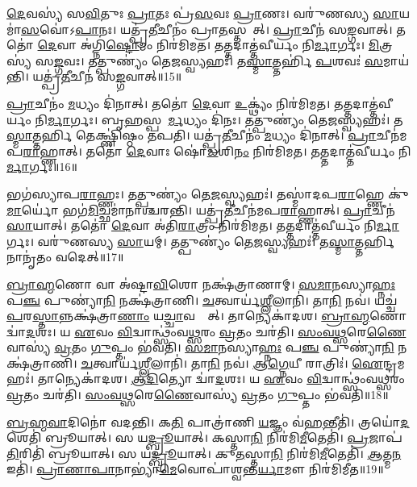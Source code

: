 \ul{𑌦𑍇}𑌵𑌸𑍍𑌯॑ 𑌸\ul{𑌵𑌿}𑌤𑍁𑌃 \ul{𑌪𑍍𑌰𑌾}𑌤𑌃 𑌪𑍍𑌰॑\ul{𑌸}𑌵𑌃 \ul{𑌪𑍍𑌰𑌾}𑌣𑌃।
𑌵𑌰𑍁॑𑌣𑌸𑍍𑌯 \ul{𑌸𑌾}𑌯𑌮𑌾॑\ul{𑌸}𑌵𑍋॑\-𑌽\ul{𑌪𑌾}𑌨𑌃।
𑌯𑌤𑍍𑌪𑍍𑌰॑\ul{𑌤𑍀}𑌚𑍀𑌨𑌂॑ 𑌪𑍍𑌰𑌾\ul{𑌤}𑌸𑍍𑌤𑌨𑌾᳚𑌤𑍍।
\ul{𑌪𑍍𑌰𑌾}𑌚𑍀𑌨॑ 𑌸\ul{𑌙𑍍𑌗}𑌵𑌾𑌤𑍍।
𑌤𑌤𑍋॑ \ul{𑌦𑍇}𑌵𑌾 𑌅॑𑌗𑍍𑌨𑌿\ul{𑌷𑍍𑌟𑍋}𑌮𑌂 𑌨𑌿𑌰॑𑌮𑌿𑌮𑌤।
𑌤𑌤𑍍𑌤𑌦𑌾𑌤𑍍𑌤॑𑌵𑍀𑌰𑍍𑌯𑌂 𑌨𑌿\ul{𑌰𑍍𑌮𑌾}𑌰𑍍𑌗𑌃।
\ul{𑌮𑌿}𑌤𑍍𑌰𑌸𑍍𑌯॑ 𑌸\ul{𑌙𑍍𑌗}𑌵𑌃।
𑌤𑌤𑍍𑌪𑍁𑌣𑍍𑌯𑌂॑ 𑌤𑍇\ul{𑌜}𑌸𑍍𑌵𑍍𑌯𑌹𑌃॑।
𑌤\ul{𑌸𑍍𑌮𑌾}𑌤𑍍𑌤𑌰𑍍\mbox{}𑌹𑌿॑ \ul{𑌪}𑌶𑌵𑌃॑ \ul{𑌸}𑌮𑌾𑌯॑𑌨𑍍𑌤𑌿।
𑌯𑌤𑍍𑌪𑍍𑌰॑\ul{𑌤𑍀}𑌚𑍀𑌨॑ 𑌸\ul{𑌙𑍍𑌗}𑌵𑌾𑌤𑍍॥15॥

\ul{𑌪𑍍𑌰𑌾}𑌚𑍀𑌨𑌂॑ \ul{𑌮}𑌧𑍍𑌯𑌂 𑌦𑌿॑𑌨𑌾𑌤𑍍।
𑌤𑌤𑍋॑ \ul{𑌦𑍇}𑌵𑌾 \ul{𑌉}𑌕𑍍𑌥𑍍𑌯𑌂॑ 𑌨𑌿𑌰॑𑌮𑌿𑌮𑌤।
𑌤𑌤𑍍𑌤𑌦𑌾𑌤𑍍𑌤॑𑌵𑍀𑌰𑍍𑌯𑌂 𑌨𑌿\ul{𑌰𑍍𑌮𑌾}𑌰𑍍𑌗𑌃।
𑌬𑍃\ul{𑌹}𑌸𑍍𑌪𑌤𑍇᳚\ul{𑌰𑍍𑌮}𑌧𑍍𑌯𑌂 𑌦𑌿॑𑌨𑌃।
𑌤𑌤𑍍𑌪𑍁𑌣𑍍𑌯𑌂॑ 𑌤𑍇\ul{𑌜}𑌸𑍍𑌵𑍍𑌯𑌹𑌃॑।
𑌤\ul{𑌸𑍍𑌮𑌾}𑌤𑍍𑌤𑌰𑍍\mbox{}\ul{𑌹𑌿} 𑌤𑍇𑌕𑍍𑌷𑍍𑌣𑌿॑𑌷𑍍𑌠𑌂 𑌤𑌪𑌤𑌿।
𑌯𑌤𑍍𑌪𑍍𑌰॑\ul{𑌤𑍀}𑌚𑍀𑌨𑌂॑ \ul{𑌮}𑌧𑍍𑌯𑌂 𑌦𑌿॑𑌨𑌾𑌤𑍍।
\ul{𑌪𑍍𑌰𑌾}𑌚𑍀𑌨॑𑌮𑌪\ul{𑌰𑌾}𑌹𑍍𑌣𑌾𑌤𑍍।
𑌤𑌤𑍋॑ \ul{𑌦𑍇}𑌵𑌾𑌃 𑌷𑍋॑\ul{𑌡}𑌶𑌿\ul{𑌨𑌂} 𑌨𑌿𑌰॑𑌮𑌿𑌮𑌤।
𑌤𑌤𑍍𑌤𑌦𑌾𑌤𑍍𑌤॑𑌵𑍀𑌰𑍍𑌯𑌂 𑌨𑌿\ul{𑌰𑍍𑌮𑌾}𑌰𑍍𑌗𑌃॥16॥

𑌭𑌗॑𑌸𑍍𑌯𑌾𑌪\ul{𑌰𑌾}𑌹𑍍𑌣𑌃।
𑌤𑌤𑍍𑌪𑍁𑌣𑍍𑌯𑌂॑ 𑌤𑍇\ul{𑌜}𑌸𑍍𑌵𑍍𑌯𑌹𑌃॑।
𑌤𑌸𑍍𑌮𑌾॑𑌦𑌪\ul{𑌰𑌾}𑌹𑍍𑌣𑍇 𑌕𑍁॑\ul{𑌮𑌾}𑌰𑍍𑌯𑍋॑ 𑌭𑌗॑\ul{𑌮𑌿}𑌚𑍍𑌛𑌮𑌾॑𑌨𑌾𑌶𑍍𑌚𑌰𑌨𑍍𑌤𑌿।
𑌯𑌤𑍍𑌪𑍍𑌰॑\ul{𑌤𑍀}𑌚𑍀𑌨॑𑌮𑌪\ul{𑌰𑌾}𑌹𑍍𑌣𑌾𑌤𑍍।
\ul{𑌪𑍍𑌰𑌾}𑌚𑍀𑌨॑ \ul{𑌸𑌾}𑌯𑌾𑌤𑍍।
𑌤𑌤𑍋॑ \ul{𑌦𑍇}𑌵𑌾 𑌅॑𑌤𑌿\ul{𑌰𑌾}𑌤𑍍𑌰𑌂 𑌨𑌿𑌰॑𑌮𑌿𑌮𑌤।
𑌤𑌤𑍍𑌤𑌦𑌾𑌤𑍍𑌤॑𑌵𑍀𑌰𑍍𑌯𑌂 𑌨𑌿\ul{𑌰𑍍𑌮𑌾}𑌰𑍍𑌗𑌃।
𑌵𑌰𑍁॑𑌣𑌸𑍍𑌯 \ul{𑌸𑌾}𑌯𑌮𑍍।
𑌤𑌤𑍍𑌪𑍁𑌣𑍍𑌯𑌂॑ 𑌤𑍇\ul{𑌜}𑌸𑍍𑌵𑍍𑌯𑌹𑌃॑।
𑌤\ul{𑌸𑍍𑌮𑌾}𑌤𑍍𑌤𑌰𑍍\mbox{}\ul{𑌹𑌿} 𑌨𑌾𑌨𑍃॑𑌤𑌂 𑌵𑌦𑍇𑌤𑍍॥17॥

\ul{𑌬𑍍𑌰𑌾}\ul{𑌹𑍍𑌮}𑌣𑍋 𑌵𑌾 𑌅॑𑌷𑍍𑌟𑌾\ul{𑌵𑌿}\ul{}𑌶𑍋 𑌨𑌕𑍍𑌷॑𑌤𑍍𑌰𑌾𑌣𑌾𑌮𑍍।
\ul{𑌸}\ul{𑌮𑌾}𑌨𑌸𑍍𑌯𑌾\ul{𑌹𑍍𑌨𑌃} 𑌪\ul{𑌞𑍍𑌚} 𑌪𑍁𑌣𑍍𑌯𑌾॑\ul{𑌨𑌿} 𑌨𑌕𑍍𑌷॑𑌤𑍍𑌰𑌾𑌣𑌿।
\ul{𑌚}𑌤𑍍𑌵𑌾𑌰𑍍𑌯॑\ul{𑌶𑍍𑌲𑍀}𑌲𑌾𑌨𑌿॑।
𑌤𑌾\ul{𑌨𑌿} 𑌨𑌵॑।
𑌯𑌚𑍍𑌚॑ \ul{𑌪}𑌰\ul{𑌸𑍍𑌤𑌾}𑌨𑍍𑌨𑌕𑍍𑌷॑𑌤𑍍𑌰𑌾\ul{𑌣𑌾𑌂} 𑌯\ul{𑌚𑍍𑌚𑌾}𑌵𑌸𑍍𑌤𑌾᳚𑌤𑍍।
𑌤𑌾𑌨𑍍𑌯𑍇𑌕𑌾॑𑌦𑌶।
\ul{𑌬𑍍𑌰𑌾}\ul{𑌹𑍍𑌮}𑌣𑍋 𑌦𑍍𑌵𑌾॑\ul{𑌦}𑌶𑌃।
𑌯 \ul{𑌏}𑌵𑌂 \ul{𑌵𑌿}𑌦𑍍𑌵𑌾𑌨𑍍𑌥𑍍𑌸𑌂॑𑌵\ul{𑌥𑍍𑌸}𑌰𑌂 \ul{𑌵𑍍𑌰}𑌤𑌂 𑌚𑌰॑𑌤𑌿।
\ul{𑌸𑌂}\ul{𑌵}\ul{𑌥𑍍𑌸}𑌰𑍇\ul{𑌣𑍈}𑌵𑌾𑌸𑍍𑌯॑ \ul{𑌵𑍍𑌰}𑌤𑌂 \ul{𑌗𑍁}𑌪𑍍𑌤𑌂 𑌭॑𑌵𑌤𑌿।
\ul{𑌸}\ul{𑌮𑌾}𑌨𑌸𑍍𑌯𑌾\ul{𑌹𑍍𑌨𑌃} 𑌪\ul{𑌞𑍍𑌚} 𑌪𑍁𑌣𑍍𑌯𑌾॑\ul{𑌨𑌿} 𑌨𑌕𑍍𑌷॑𑌤𑍍𑌰𑌾𑌣𑌿।
\ul{𑌚}𑌤𑍍𑌵𑌾𑌰𑍍𑌯॑\ul{𑌶𑍍𑌲𑍀}𑌲𑌾𑌨𑌿॑।
𑌤𑌾\ul{𑌨𑌿} 𑌨𑌵॑।
\ul{𑌆}\ul{𑌗𑍍𑌨𑍇}𑌯𑍀 𑌰𑌾𑌤𑍍𑌰𑌿𑌃॑।
\ul{𑌐}𑌨𑍍𑌦𑍍𑌰𑌮𑌹𑌃॑।
𑌤𑌾𑌨𑍍𑌯𑍇𑌕𑌾॑𑌦𑌶।
\ul{𑌆}\ul{𑌦𑌿}𑌤𑍍𑌯𑍋 𑌦𑍍𑌵𑌾॑\ul{𑌦}𑌶𑌃।
𑌯 \ul{𑌏}𑌵𑌂 \ul{𑌵𑌿}𑌦𑍍𑌵𑌾𑌨𑍍𑌥𑍍𑌸𑌂॑𑌵\ul{𑌥𑍍𑌸}𑌰𑌂 \ul{𑌵𑍍𑌰}𑌤𑌂 𑌚𑌰॑𑌤𑌿।
\ul{𑌸𑌂}\ul{𑌵}\ul{𑌥𑍍𑌸}𑌰𑍇\ul{𑌣𑍈}𑌵𑌾𑌸𑍍𑌯॑ \ul{𑌵𑍍𑌰}𑌤𑌂 \ul{𑌗𑍁}𑌪𑍍𑌤𑌂 𑌭॑𑌵𑌤𑌿॥18॥\anuvakamend[\ul{𑌸}\ul{𑌙𑍍𑌗}𑌵𑌾𑌥𑍍𑌷𑍋॑\ul{𑌡}𑌶𑌿\ul{𑌨𑌂} 𑌨𑌿𑌰॑𑌮𑌿𑌮\ul{𑌤} 𑌤𑌤𑍍𑌤𑌦𑌾𑌤𑍍𑌤॑𑌵𑍀𑌰𑍍𑌯𑌂 𑌨𑌿\ul{𑌰𑍍𑌮𑌾}𑌰𑍍𑌗𑍋 𑌵॑𑌦𑍇𑌦𑍍𑌭𑌵𑌤𑌿 𑌸\ul{𑌮𑌾}𑌨𑌸𑍍𑌯𑌾\ul{𑌹𑍍𑌨𑌃} 𑌪\ul{𑌞𑍍𑌚} 𑌪𑍁𑌣𑍍𑌯𑌾॑\ul{𑌨𑌿} 𑌨𑌕𑍍𑌷॑𑌤𑍍𑌰𑌾\ul{𑌣𑍍𑌯}𑌷𑍍𑌟𑍗 𑌚॑]

\ul{𑌬𑍍𑌰}\ul{𑌹𑍍𑌮}\ul{𑌵𑌾}𑌦𑌿𑌨𑍋॑ 𑌵𑌦𑌨𑍍𑌤𑌿।
𑌕\ul{𑌤𑌿} 𑌪𑌾𑌤𑍍𑌰𑌾॑𑌣𑌿 \ul{𑌯}𑌜𑍍𑌞𑌂 𑌵॑\ul{𑌹}𑌨𑍍𑌤𑍀𑌤𑌿॑।
𑌤𑍍𑌰𑌯𑍋॑\ul{𑌦}𑌶𑍇𑌤𑌿॑ 𑌬𑍍𑌰𑍂𑌯𑌾𑌤𑍍।
𑌸 𑌯\ul{𑌦𑍍𑌬𑍍𑌰𑍂}𑌯𑌾𑌤𑍍।
𑌕𑌸𑍍𑌤𑌾\ul{𑌨𑌿} 𑌨𑌿𑌰॑𑌮𑌿\ul{𑌮𑍀}𑌤𑍇𑌤𑌿॑।
\ul{𑌪𑍍𑌰}𑌜𑌾𑌪॑\ul{𑌤𑌿}𑌰𑌿𑌤𑌿॑ 𑌬𑍍𑌰𑍂𑌯𑌾𑌤𑍍।
𑌸 𑌯\ul{𑌦𑍍𑌬𑍍𑌰𑍂}𑌯𑌾𑌤𑍍।
𑌕𑍁\ul{𑌤}𑌸𑍍𑌤𑌾\ul{𑌨𑌿} 𑌨𑌿𑌰॑𑌮𑌿\ul{𑌮𑍀}𑌤𑍇𑌤𑌿॑।
\ul{𑌆}𑌤𑍍𑌮\ul{𑌨} 𑌇𑌤𑌿॑।
\ul{𑌪𑍍𑌰𑌾}\ul{𑌣𑌾}\ul{𑌪𑌾}𑌨𑌾𑌭𑍍𑌯𑌾॑\ul{𑌮𑍇}𑌵𑍋𑌪𑌾॑\-𑌶𑍍𑌵𑌨𑍍𑌤\ul{𑌰𑍍𑌯𑌾}𑌮𑍗 𑌨𑌿𑌰॑𑌮𑌿𑌮𑍀𑌤॥19॥

